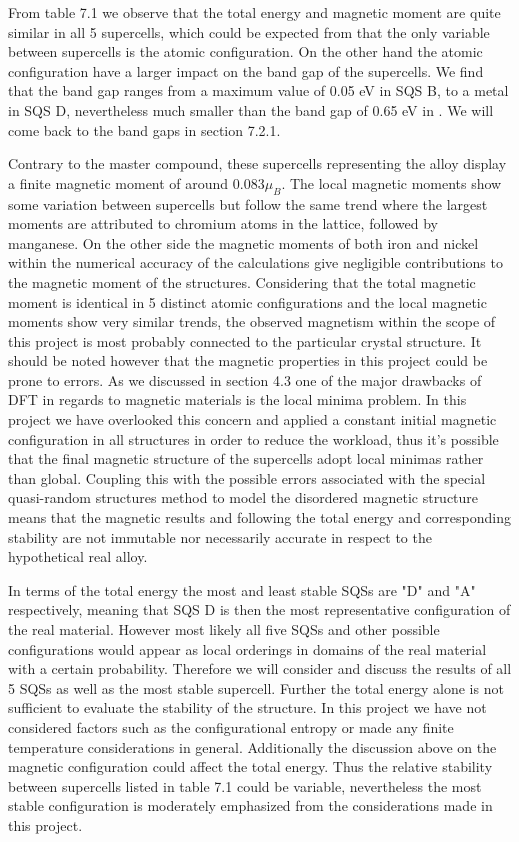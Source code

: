 From table 7.1 we observe that the total energy and magnetic moment are quite similar in all 5 supercells, which could be expected from that the only variable between supercells is the atomic configuration. On the other hand the atomic configuration have a larger impact on the band gap of the supercells. We find that the band gap ranges from a maximum value of 0.05 eV in SQS B, to a metal in SQS D, nevertheless much smaller than the band gap of 0.65 eV in . We will come back to the band gaps in section 7.2.1. 

Contrary to the master compound, these supercells representing the  alloy display a finite magnetic moment of around $0.083 \mu_B$. The local magnetic moments show some variation between supercells but follow the same trend where the largest moments are attributed to chromium atoms in the lattice, followed by manganese. On the other side the magnetic moments of both iron and nickel within the numerical accuracy of the calculations give negligible contributions to the magnetic moment of the structures. Considering that the total magnetic moment is identical in 5 distinct atomic configurations and the local magnetic moments show very similar trends, the observed magnetism within the scope of this project is most probably connected to the particular crystal structure. It should be noted however that the magnetic properties in this project could be prone to errors. As we discussed in section 4.3 one of the major drawbacks of DFT in regards to magnetic materials is the local minima problem. In this project we have overlooked this concern and applied a constant initial magnetic configuration in all structures in order to reduce the workload, thus it's possible that the final magnetic structure of the supercells adopt local minimas rather than global. Coupling this with the possible errors associated with the special quasi-random structures method to model the disordered magnetic structure means that the magnetic results and following the total energy and corresponding stability are not immutable nor necessarily accurate in respect to the hypothetical real alloy. 
    
In terms of the total energy the most and least stable SQSs are "D" and "A" respectively, meaning that SQS D is then the most representative configuration of the real material. However most likely all five SQSs and other possible configurations would appear as local orderings in domains of the real material with a certain probability. Therefore we will consider and discuss the results of all 5 SQSs as well as the most stable supercell. Further the total energy alone is not sufficient to evaluate the stability of the structure. In this project we have not considered factors such as the configurational entropy or made any finite temperature considerations in general. Additionally the discussion above on the magnetic configuration could affect the total energy. Thus the relative stability between supercells listed in table 7.1 could be variable, nevertheless the most stable configuration is moderately emphasized from the considerations made in this project.
 
